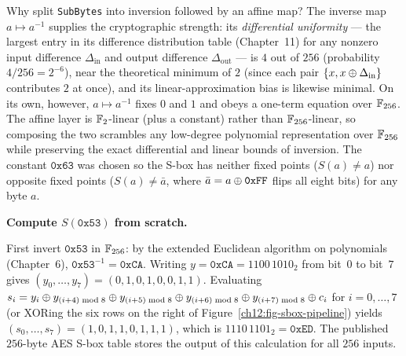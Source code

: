\begin{whybox}
Why split \texttt{SubBytes} into inversion followed by an affine map? The inverse
map $a \mapsto a^{-1}$ supplies the cryptographic strength: its \emph{differential
uniformity} --- the largest entry in its difference distribution table (Chapter~11)
for any nonzero input difference $\Delta_{\mathrm{in}}$ and output difference
$\Delta_{\mathrm{out}}$ --- is $4$ out of $256$ (probability $4/256 = 2^{-6}$), near
the theoretical minimum of $2$ (since each pair $\{x, x \oplus \Delta_{\mathrm{in}}\}$
contributes $2$ at once), and its linear-approximation bias is likewise minimal.
On its own, however, $a \mapsto a^{-1}$ fixes $0$ and $1$ and obeys a one-term
equation over $\mathbb{F}_{256}$. The affine layer is $\mathbb{F}_2$-linear (plus a constant)
rather than $\mathbb{F}_{256}$-linear, so composing the two scrambles any low-degree
polynomial representation over $\mathbb{F}_{256}$ while preserving the exact differential
and linear bounds of inversion. The constant $\mathtt{0x63}$ was chosen so the
S-box has neither fixed points ($S(a) \neq a$) nor opposite fixed points
($S(a) \neq \bar a$, where $\bar a = a \oplus \mathtt{0xFF}$ flips all eight bits)
for any byte $a$.
\end{whybox}

\begin{walkbox}
\textbf{Compute $S(\mathtt{0x53})$ from scratch.}

First invert $\mathtt{0x53}$ in $\mathbb{F}_{256}$: by the extended Euclidean algorithm on
polynomials (Chapter~6), $\mathtt{0x53}^{-1} = \mathtt{0xCA}$. Writing
$y = \mathtt{0xCA} = 1100\,1010_2$ from bit~$0$ to bit~$7$ gives
$(y_0,\dots,y_7) = (0,1,0,1,0,0,1,1)$. Evaluating
$s_i = y_i \oplus y_{(i+4)\bmod 8} \oplus y_{(i+5)\bmod 8} \oplus y_{(i+6)\bmod 8} \oplus y_{(i+7)\bmod 8} \oplus c_i$
for $i = 0,\dots,7$ (or XORing the six rows on the right of
Figure~\ref{ch12:fig-sbox-pipeline}) yields $(s_0,\dots,s_7) = (1,0,1,1,0,1,1,1)$,
which is $1110\,1101_2 = \mathtt{0xED}$. The published $256$-byte AES S-box table
stores the output of this calculation for all $256$ inputs.
\end{walkbox}

